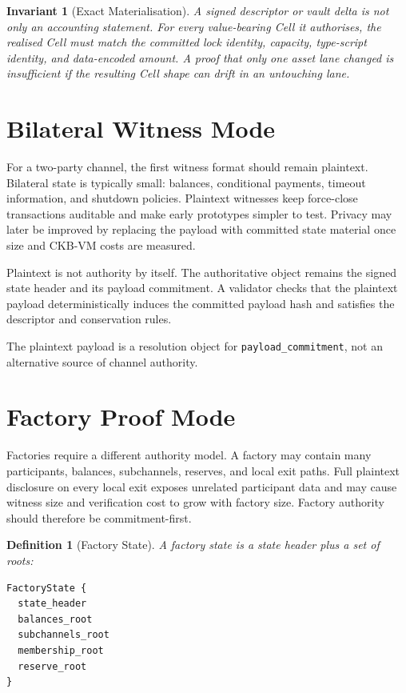 \documentclass[a4paper,11pt]{article}
\newtheorem{definition}{Definition}
\newtheorem{invariant}{Invariant}
\begin{document}
\begin{invariant}[Exact Materialisation]
A signed descriptor or vault delta is not only an accounting statement. For every value-bearing Cell it authorises, the realised Cell must match the committed lock identity, capacity, type-script identity, and data-encoded amount. A proof that only one asset lane changed is insufficient if the resulting Cell shape can drift in an untouching lane.
\end{invariant}

\clearpage
\section{Bilateral Witness Mode}

For a two-party channel, the first witness format should remain plaintext. Bilateral state is typically small: balances, conditional payments, timeout information, and shutdown policies. Plaintext witnesses keep force-close transactions auditable and make early prototypes simpler to test. Privacy may later be improved by replacing the payload with committed state material once size and CKB-VM costs are measured.

Plaintext is not authority by itself. The authoritative object remains the signed state header and its payload commitment. A validator checks that the plaintext payload deterministically induces the committed payload hash and satisfies the descriptor and conservation rules.

The plaintext payload is a resolution object for \texttt{payload\_commitment},
not an alternative source of channel authority.

\clearpage
\section{Factory Proof Mode}

Factories require a different authority model. A factory may contain many participants, balances, subchannels, reserves, and local exit paths. Full plaintext disclosure on every local exit exposes unrelated participant data and may cause witness size and verification cost to grow with factory size. Factory authority should therefore be commitment-first.

\begin{definition}[Factory State]
A factory state is a state header plus a set of roots:
\begin{lstlisting}
FactoryState {
  state_header
  balances_root
  subchannels_root
  membership_root
  reserve_root
}
\end{lstlisting}
\end{definition}
\end{document}
